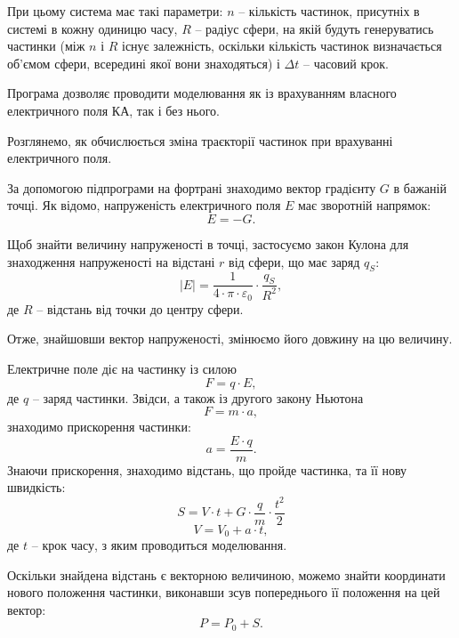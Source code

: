 \documentclass[a4paper,12pt]{article}
\begin{document}
 При цьому система має такі параметри: $n$ -- кількість частинок, присутніх в системі в кожну одиницю часу, $R$ -- радіус сфери, на якій будуть генеруватись частинки (між $n$ і $R$ існує залежність, оскільки кількість частинок визначається об’ємом сфери, всередині якої вони знаходяться) і $\Delta t$ -- часовий крок.
 
 Програма дозволяє проводити моделювання як із врахуванням власного електричного поля КА, так і без нього.

Розглянемо, як обчислюється зміна траєкторії частинок при врахуванні електричного поля.

За допомогою підпрограми на фортрані знаходимо вектор градієнту $G$ в бажаній точці. Як відомо, напруженість електричного поля $E$ має зворотній напрямок:
\[
E = -G.
\]

Щоб знайти величину напруженості в точці, застосуємо закон Кулона для знаходження напруженості на відстані $r$ від сфери, що має заряд $q_S$:
\[
|E| = \frac{1}{4 \cdot \pi \cdot \varepsilon_0} \cdot \frac{q_S}{R^2},
\]
де $R$ -- відстань від точки до центру сфери.

Отже, знайшовши вектор напруженості, змінюємо його довжину на цю величину.

Електричне поле діє на частинку із силою
\[
F = q \cdot E,
\]
де $q$ -- заряд частинки.
Звідси, а також із другого закону Ньютона
\[
F = m \cdot a,
\]
знаходимо прискорення частинки:
\[
a = \frac{E \cdot q}{m}.
\]
Знаючи прискорення, знаходимо відстань, що пройде частинка, та її нову швидкість:
\[
S = V \cdot t + G \cdot \frac{q}{m} \cdot \frac{t^2}{2}
\]
\[
V = V_{0} + a \cdot t,
\]
де $t$ -- крок часу, з яким проводиться моделювання.

Оскільки знайдена відстань є векторною величиною, можемо знайти координати нового положення частинки, виконавши зсув попереднього її положення на цей вектор:
\[
P = P_0 + S.
\]
 
 
\end{document}
